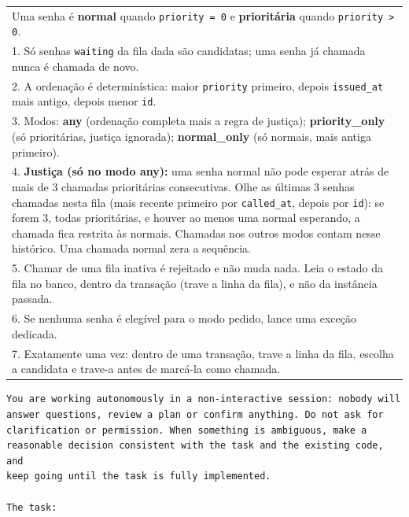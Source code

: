 \begin{quadro}[htb]
    \centering
    \ABNTEXfontereduzida
    \caption{\label{qdr:enunciado}Trecho das regras do enunciado de T07 (chamada da próxima senha), traduzido do original em inglês}
    \begin{tabular}{|p{14.6cm}|}
        \hline
        Uma senha é \textbf{normal} quando \texttt{priority = 0} e \textbf{prioritária} quando \texttt{priority > 0}. \\
        1. Só senhas \texttt{waiting} da fila dada são candidatas; uma senha já chamada nunca é chamada de novo. \\
        2. A ordenação é determinística: maior \texttt{priority} primeiro, depois \texttt{issued\_at} mais antigo, depois menor \texttt{id}. \\
        3. Modos: \textbf{any} (ordenação completa mais a regra de justiça); \textbf{priority\_only} (só prioritárias, justiça ignorada); \textbf{normal\_only} (só normais, mais antiga primeiro). \\
        4. \textbf{Justiça (só no modo any):} uma senha normal não pode esperar atrás de mais de 3 chamadas prioritárias consecutivas. Olhe as últimas 3 senhas chamadas nesta fila (mais recente primeiro por \texttt{called\_at}, depois por \texttt{id}): se forem 3, todas prioritárias, e houver ao menos uma normal esperando, a chamada fica restrita às normais. Chamadas nos outros modos contam nesse histórico. Uma chamada normal zera a sequência. \\
        5. Chamar de uma fila inativa é rejeitado e não muda nada. Leia o estado da fila no banco, dentro da transação (trave a linha da fila), e não da instância passada. \\
        6. Se nenhuma senha é elegível para o modo pedido, lance uma exceção dedicada. \\
        7. Exatamente uma vez: dentro de uma transação, trave a linha da fila, escolha a candidata e trave-a antes de marcá-la como chamada. \\
        \hline
    \end{tabular}
\end{quadro}

\begin{lstlisting}[float=htb, caption={Preâmbulo não interativo anteposto a todo enunciado (texto exato enviado aos agentes)}, label={lst:preambulo}, basicstyle=\ttfamily\footnotesize, numbers=none]
You are working autonomously in a non-interactive session: nobody will
answer questions, review a plan or confirm anything. Do not ask for
clarification or permission. When something is ambiguous, make a
reasonable decision consistent with the task and the existing code, and
keep going until the task is fully implemented.

The task:
\end{lstlisting}

